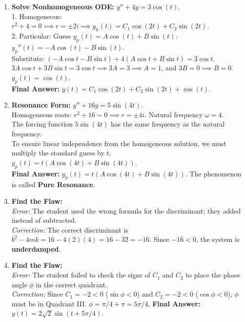 \documentclass[11pt]{article}
\begin{document}
\begin{enumerate}[label=\textbf{\arabic*.}]
    \item \textbf{Solve Nonhomogeneous ODE:} $y'' + 4y = 3\cos(t)$. \\
    1. Homogeneous: $r^2 + 4 = 0 \implies r = \pm 2i \implies y_h(t) = C_1 \cos(2t) + C_2 \sin(2t)$. \\
    2. Particular: Guess $y_p(t) = A\cos(t) + B\sin(t)$. \\
    $y_p''(t) = -A\cos(t) - B\sin(t)$. \\
    Substitute: $(-A\cos t - B\sin t) + 4(A\cos t + B\sin t) = 3\cos t$. \\
    $3A\cos t + 3B\sin t = 3\cos t \implies 3A = 3 \implies A = 1$, and $3B = 0 \implies B = 0$. \\
    $y_p(t) = \cos(t)$. \\
    \textbf{Final Answer:} $y(t) = C_1 \cos(2t) + C_2 \sin(2t) + \cos(t)$.

    \item \textbf{Resonance Form:} $y'' + 16y = 5\sin(4t)$. \\
    Homogeneous roots: $r^2 + 16 = 0 \implies r = \pm 4i$. Natural frequency $\omega = 4$. \\
    The forcing function $5\sin(4t)$ has the same frequency as the natural frequency. \\
    To ensure linear independence from the homogeneous solution, we must multiply the standard guess by $t$. \\
    $y_p(t) = t(A\cos(4t) + B\sin(4t))$. \\
    \textbf{Final Answer:} $y_p(t) = t(A\cos(4t) + B\sin(4t))$. The phenomenon is called \textbf{Pure Resonance}.

    \item \textbf{Find the Flaw:} \\
    \textit{Error:} The student used the wrong formula for the discriminant; they added instead of subtracted. \\
    \textit{Correction:} The correct discriminant is $b^2 - 4mk = 16 - 4(2)(4) = 16 - 32 = -16$. Since $-16 < 0$, the system is \textbf{underdamped}.

    \item \textbf{Find the Flaw:} \\
    \textit{Error:} The student failed to check the signs of $C_1$ and $C_2$ to place the phase angle $\phi$ in the correct quadrant. \\
    \textit{Correction:} Since $C_1 = -2 < 0$ ($\sin \phi < 0$) and $C_2 = -2 < 0$ ($\cos \phi < 0$), $\phi$ must be in Quadrant III. $\phi = \pi/4 + \pi = 5\pi/4$. \textbf{Final Answer:} $y(t) = 2\sqrt{2}\sin(t + 5\pi/4)$.


\end{enumerate}
\end{document}

